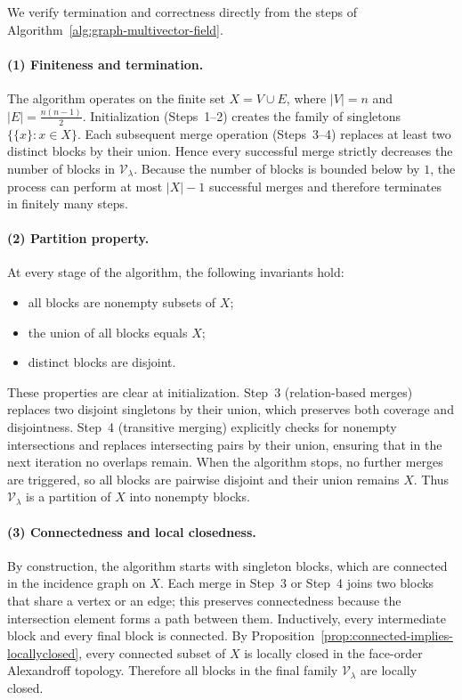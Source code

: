 \documentclass{article}
\theoremstyle{definition}
\theoremstyle{plain}
\theoremstyle{remark}
\newcommand{\1}{\mathbbm{1}}  %
\renewenvironment{proof}{{\bf Proof:\ }}{\qedsymbol}%
\begin{document}
\begin{proof}
We verify termination and correctness directly from the steps of
Algorithm~\ref{alg:graph-multivector-field}.

\paragraph{(1) Finiteness and termination.}
The algorithm operates on the finite set
\(X = V \cup E\), where \(|V|=n\) and \(|E| = \frac{n(n-1)}{2}\).
Initialization (Steps~1–2) creates the family of singletons
\(\{\{x\}:x\in X\}\).
Each subsequent merge operation (Steps~3–4) replaces at least two distinct
blocks by their union.  Hence every successful merge strictly decreases the
number of blocks in \(\mathcal V_\lambda\).  Because the number of blocks is
bounded below by \(1\), the process can perform at most \(|X|-1\) successful
merges and therefore terminates in finitely many steps.

\paragraph{(2) Partition property.}
At every stage of the algorithm, the following invariants hold:
\begin{itemize}
    \item all blocks are nonempty subsets of \(X\);
    \item the union of all blocks equals \(X\);
    \item distinct blocks are disjoint.
\end{itemize}
These properties are clear at initialization.  
Step~3 (relation-based merges) replaces two disjoint singletons by their
union, which preserves both coverage and disjointness.  
Step~4 (transitive merging) explicitly checks for nonempty intersections and
replaces intersecting pairs by their union, ensuring that in the next
iteration no overlaps remain.  
When the algorithm stops, no further merges are triggered, so all blocks are
pairwise disjoint and their union remains \(X\).  Thus
\(\mathcal V_\lambda\) is a partition of \(X\) into nonempty blocks.

\paragraph{(3) Connectedness and local closedness.}
By construction, the algorithm starts with singleton blocks, which are
connected in the incidence graph on \(X\).  
Each merge in Step~3 or Step~4 joins two blocks that share a vertex or an
edge; this preserves connectedness because the intersection element forms a
path between them.  
Inductively, every intermediate block and every final block is connected.
By Proposition~\ref{prop:connected-implies-locallyclosed},
every connected subset of \(X\) is locally closed in the face-order
Alexandroff topology.  Therefore all blocks in the final family
\(\mathcal V_\lambda\) are locally closed.


\end{proof}
\end{document}
